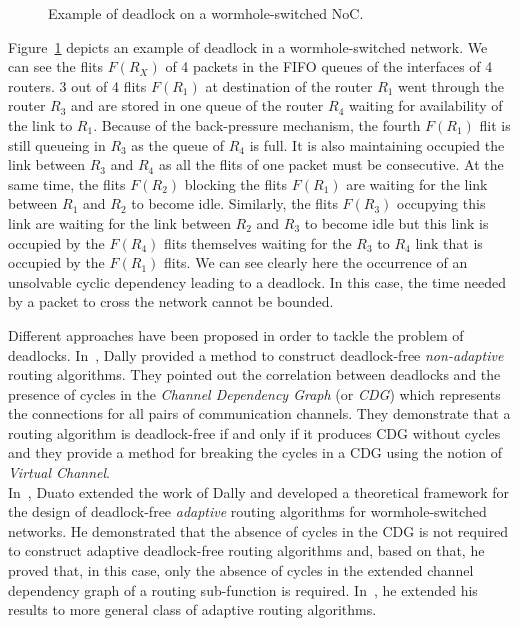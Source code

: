\documentclass[main.tex]{subfiles}
\begin{document}
\begin{example}
    \begin{figure}
        \centering
        \scalebox{0.5}{}
        \caption{Example of deadlock on a wormhole-switched NoC.}
        \label{fig_stateOfTheArt_NoCdeadlock}
    \end{figure}
    Figure~\ref{fig_stateOfTheArt_NoCdeadlock} depicts an example of deadlock
    in a wormhole-switched network. We can see the flits $F(R_X)$ of 4 packets
    in the FIFO queues of the interfaces of 4 routers. 3 out of 4 flits
    $F(R_1)$ at destination of the router $R_1$ went through the router $R_3$
    and are stored in one queue of the router $R_4$ waiting for availability of
    the link to $R_1$. Because of the back-pressure mechanism, the fourth
    $F(R_1)$ flit is still queueing in $R_3$ as the queue of $R_4$ is full. It
    is also maintaining occupied the link between $R_3$ and $R_4$ as all the
    flits of one packet must be consecutive. At the same time, the flits
    $F(R_2)$ blocking the flits $F(R_1)$ are waiting for the link between $R_1$
    and $R_2$ to become idle. Similarly, the flits $F(R_3)$ occupying this link
    are waiting for the link between $R_2$ and $R_3$ to become idle but this
    link is occupied by the $F(R_4)$ flits themselves waiting for the $R_3$ to
    $R_4$ link that is occupied by the $F(R_1)$ flits. We can see clearly here
    the occurrence of an unsolvable cyclic dependency leading to a deadlock. In
    this case, the time needed by a packet to cross the network cannot be
    bounded. 
\end{example}

Different approaches have been proposed in order to tackle the problem of
deadlocks. In~\cite{Dally1987}, Dally \etal provided a method to construct
deadlock-free \emph{non-adaptive} routing algorithms. They pointed out the
correlation between deadlocks and the presence of cycles in the \emph{Channel
Dependency Graph} (or \emph{CDG}) which represents the connections for all
pairs of communication channels. They demonstrate that a routing algorithm is
deadlock-free if and only if it produces CDG without cycles and they provide a
method for breaking the cycles in a CDG using the notion of \emph{Virtual
Channel}. \\

In~\cite{Duato1993}, Duato extended the work of Dally \etal and developed a
theoretical framework for the design of deadlock-free \emph{adaptive} routing
algorithms for wormhole-switched networks. He demonstrated that the absence of
cycles in the CDG is not required to construct adaptive deadlock-free routing
algorithms and, based on that, he proved that, in this case, only the absence
of cycles in the extended channel dependency graph of a routing sub-function is
required. In~\cite{Duato1995}, he extended his results to more general class of
adaptive routing algorithms. \\
\end{document}
